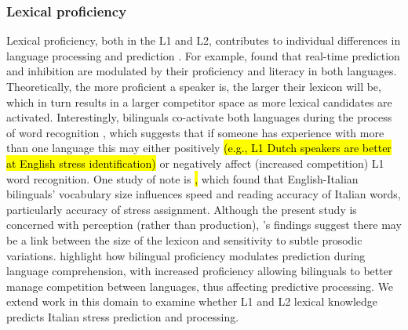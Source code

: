 \subsubsection{Lexical proficiency}
Lexical proficiency, both in the L1 and L2, contributes to individual differences in language processing and prediction \citep{Diependaele2013, Yap2012}. For example, \cite{Kukona2016} found that real-time prediction and inhibition are modulated by their proficiency and literacy in both languages. Theoretically, the more proficient a speaker is, the larger their lexicon will be, which in turn results in a larger competitor space as more lexical candidates are activated. Interestingly, bilinguals co-activate both languages during the process of word recognition \citep{kroll1997lexical, dijkstra2002architecture, marian2003competing}, which suggests that if someone has experience with more than one language this may either positively \hl{(e.g., L1 Dutch speakers are better at English stress identification)} or negatively affect (increased competition) L1 word recognition. One study of note is \cite{primativo2013bilingual}\hl{,} which found that English-Italian bilinguals' vocabulary size influences speed and reading accuracy of Italian words, particularly accuracy of stress assignment. Although the present study is concerned with perception (rather than production), \cite{primativo2013bilingual}'s findings suggest there may be a link between the size of the lexicon and sensitivity to subtle prosodic variations. \cite{misra2012} highlight how bilingual proficiency modulates prediction during language comprehension, with increased proficiency allowing bilinguals to better manage competition between languages, thus affecting predictive processing. We extend work in this domain to examine whether L1 and L2 lexical knowledge predicts Italian stress prediction and processing.

